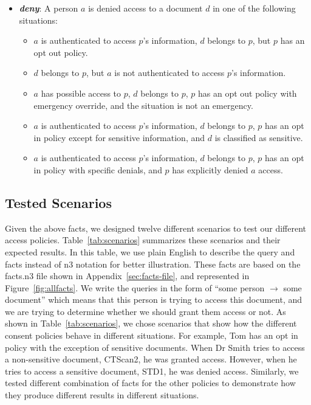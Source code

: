 \documentclass[conference]{IEEEtran}
\begin{document}
\begin{itemize}
\item \textbf{\textit{deny}}: A person $a$ is denied access to a document $d$ in one of the following situations:
\begin{itemize}
 \item $a$ is authenticated to access $p$'s information, $d$ belongs to $p$, but $p$ has an opt out policy.
\item $d$ belongs to $p$, but $a$ is not authenticated to access $p$'s information.
\item $a$ has possible access to $p$, $d$ belongs to $p$, $p$ has an opt out policy with emergency override, and the situation is not an emergency.
\item $a$ is authenticated to access $p$'s information, $d$ belongs to $p$, $p$ has an opt in policy except for sensitive information, and $d$ is classified as
sensitive.
\item $a$ is authenticated to access $p$'s information, $d$ belongs to $p$, $p$ has an opt in policy with specific denials, and $p$ has explicitly denied $a$
access.
\end{itemize}

\end{itemize}



\subsection{Tested Scenarios}

Given the above facts, we designed twelve different scenarios to test our different access policies. Table~\ref{tab:scenarios} summarizes these scenarios and
their expected results. In this table, we use plain English to describe the query and facts instead of n3 notation for better illustration. These facts are
based on the facts.n3 file shown in Appendix~\ref{sec:facts-file}, and represented in Figure~\ref{fig:allfacts}. We write the queries in the form of ``some
person $\rightarrow$ some document'' which means that this person is trying to
access this document, and we are trying to determine whether we should grant them access or not. As shown in Table~\ref{tab:scenarios}, we chose scenarios that
show how the different consent policies behave in different situations. For example, Tom has an opt in policy with the exception of sensitive documents. When
Dr Smith tries to access a non-sensitive document, CTScan2, he was granted access. However, when he tries to access a sensitive document, STD1, he was denied
access. Similarly, we tested different combination of facts for the other policies to demonstrate how they produce different results in different situations.
\end{document}

